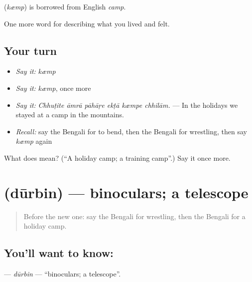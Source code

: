 \begin{cousinweb}
\textbf{} (\emph{kæmp}) is borrowed from English \emph{camp}.
\end{cousinweb}

\begin{grammarlens}[title={What you've built}]
One more word for describing what you lived and felt.
\end{grammarlens}

\subsection*{Your turn}
\begin{itemize}
\raggedright
  \item \emph{Say it:} \emph{kæmp}
  \item \emph{Say it:} \emph{kæmp}, once more
  \item \emph{Say it:} \emph{Chhuṭite āmrā pāhāṛe ekṭā kæmpe chhilām.} — In the holidays we stayed at a camp in the mountains.
  \item \emph{Recall:} say the Bengali for to bend, then the Bengali for wrestling, then say \emph{kæmp} again
\end{itemize}

\begin{tcolorbox}[breakable,colback=teal!4,colframe=teal!35!black,title={Before you move on}]
What does  mean? (\textquotedblleft{}A holiday camp; a training camp\textquotedblright{}.) Say it once more.
\end{tcolorbox}
\section[\texorpdfstring{\bn{দূরবিন} (dūrbin)}{দূরবিন (dūrbin)}]{ (dūrbin) — binoculars; a telescope}

\label{lesson:BN-C523-durbin}



\begin{quote}
Before the new one: say the Bengali for wrestling, then the Bengali for a holiday camp.
\end{quote}

\subsection*{You'll want to know: }
\textbf{} — \emph{dūrbin} — \textquotedblleft{}binoculars; a telescope\textquotedblright{}.


